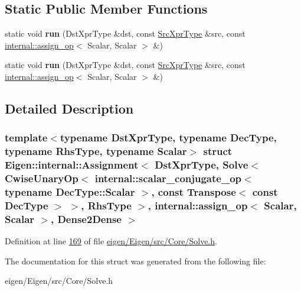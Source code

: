 \subsection*{Static Public Member Functions}
\begin{DoxyCompactItemize}
\item 
\mbox{\label{struct_eigen_1_1internal_1_1_assignment_3_01_dst_xpr_type_00_01_solve_3_01_cwise_unary_op_3_01in7a0cdfc0a6924bfcd9bc281e374a4ff8_a4bb3d1d8bcd482b994fb81569a61a0f0}} 
static void {\bfseries run} (Dst\+Xpr\+Type \&dst, const \hyperlink{group___core___module_class_eigen_1_1_solve}{Src\+Xpr\+Type} \&src, const \hyperlink{struct_eigen_1_1internal_1_1assign__op}{internal\+::assign\+\_\+op}$<$ Scalar, Scalar $>$ \&)
\item 
\mbox{\label{struct_eigen_1_1internal_1_1_assignment_3_01_dst_xpr_type_00_01_solve_3_01_cwise_unary_op_3_01in7a0cdfc0a6924bfcd9bc281e374a4ff8_a4bb3d1d8bcd482b994fb81569a61a0f0}} 
static void {\bfseries run} (Dst\+Xpr\+Type \&dst, const \hyperlink{group___core___module_class_eigen_1_1_solve}{Src\+Xpr\+Type} \&src, const \hyperlink{struct_eigen_1_1internal_1_1assign__op}{internal\+::assign\+\_\+op}$<$ Scalar, Scalar $>$ \&)
\end{DoxyCompactItemize}


\subsection{Detailed Description}
\subsubsection*{template$<$typename Dst\+Xpr\+Type, typename Dec\+Type, typename Rhs\+Type, typename Scalar$>$\newline
struct Eigen\+::internal\+::\+Assignment$<$ Dst\+Xpr\+Type, Solve$<$ Cwise\+Unary\+Op$<$ internal\+::scalar\+\_\+conjugate\+\_\+op$<$ typename Dec\+Type\+::\+Scalar $>$, const Transpose$<$ const Dec\+Type $>$ $>$, Rhs\+Type $>$, internal\+::assign\+\_\+op$<$ Scalar, Scalar $>$, Dense2\+Dense $>$}



Definition at line \hyperlink{eigen_2_eigen_2src_2_core_2_solve_8h_source_l00169}{169} of file \hyperlink{eigen_2_eigen_2src_2_core_2_solve_8h_source}{eigen/\+Eigen/src/\+Core/\+Solve.\+h}.



The documentation for this struct was generated from the following file\+:\begin{DoxyCompactItemize}
\item 
eigen/\+Eigen/src/\+Core/\+Solve.\+h\end{DoxyCompactItemize}
